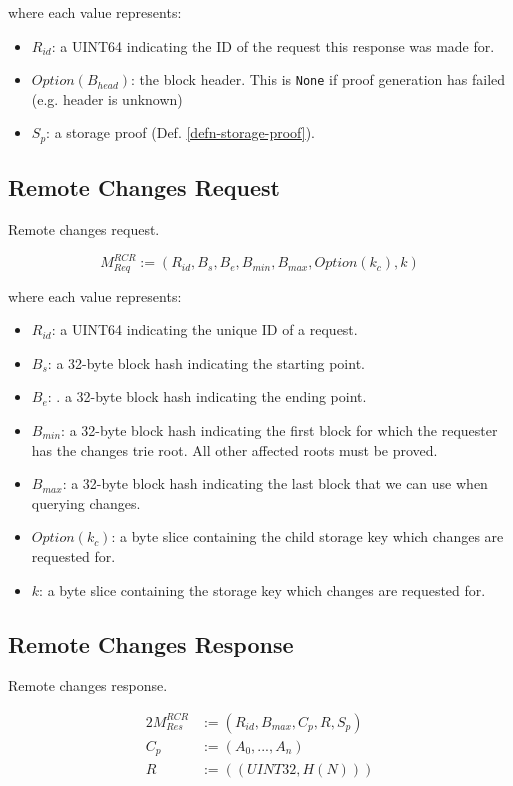 \documentclass{book}
\begin{document}
where each value represents:

\begin{itemize}
    \item $R_{id}$: a UINT64 indicating the ID of the request this response was
    made for.
    \item $Option(B_{head})$: the block header. This is \verb|None| if proof generation
    has failed (e.g. header is unknown)
    \item $S_p$: a storage proof (Def. \ref{defn-storage-proof}).
\end{itemize}

\subsection{Remote Changes Request}\label{sect-remote-changes-request}

Remote changes request.

\[
    M^{RCR}_{Req} := (R_{id}, B_s, B_e, B_{min}, B_{max}, Option(k_c), k)
\]

where each value represents:

\begin{itemize}
    \item $R_{id}$: a UINT64 indicating the unique ID of a request.
    \item $B_s$: a 32-byte block hash indicating the starting point.
    \item $B_e$: . a 32-byte block hash indicating the ending point.
    \item $B_{min}$: a 32-byte block hash indicating the first block for which
    the requester has the changes trie root. All other affected roots must be
    proved.
    \item $B_{max}$: a 32-byte block hash indicating the last block that we can
    use when querying changes.
    \item $Option(k_c)$: a byte slice containing the child storage key which
    changes are requested for.
    \item $k$: a byte slice containing the storage key which changes are
    requested for.
\end{itemize}

\subsection{Remote Changes Response}

Remote changes response.

\begin{alignat*}{2}
    M^{RCR}_{Res} &:= (R_{id}, B_{max}, C_p, R, S_p) \\
    C_p &:= (A_0, ...,A_n) \\
    R &:= ((UINT32, H(N)))
\end{alignat*}
\end{document}
